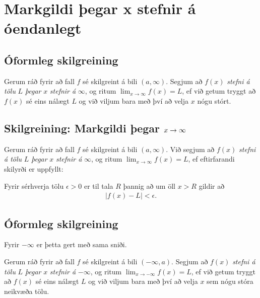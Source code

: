 \documentclass[a4paper,10pt,icelandic]{sphinxmanual}
\begin{document}
\section{Markgildi þegar x stefnir á óendanlegt}
\label{kafli02:markgildi-egar-x-stefnir-a-oendanlegt}


\subsection{Óformleg skilgreining}
\label{kafli02:id4}\label{kafli02:index-4}
Gerum ráð fyrir að fall \(f\) sé skilgreint á bili
\((a, \infty)\). Segjum að \(f(x)\) \emph{stefni á tölu} \(L\)
\emph{þegar} \(x\) \emph{stefnir á} \(\infty\), og ritum
\(\lim_{x\rightarrow \infty} f(x)=L\), ef við getum tryggt að
\(f(x)\) sé eins nálægt \(L\) og við viljum bara með því að
velja \(x\) nógu stórt.


\subsection{Skilgreining: Markgildi þegar \protect\(x \to \infty\protect\)}
\label{kafli02:skilgreining-markgildi-egar}
Gerum ráð fyrir að fall \(f\) sé skilgreint á bili
\((a,\infty)\). Við segjum að \(f(x)\) \emph{stefni á tölu} \(L\)
\emph{þegar} \(x\) \emph{stefnir á} \(\infty\), og ritum
\(\lim_{x\rightarrow \infty} f(x)=L\), ef eftirfarandi skilyrði er
uppfyllt:

Fyrir sérhverja tölu \(\epsilon>0\) er til tala \(R\)
þannig að um öll \(x>R\) gildir að
\begin{equation*}
\begin{split}|f(x)-L|<\epsilon.\end{split}
\end{equation*}

\subsection{Óformleg skilgreining}
\label{kafli02:id5}
Fyrir \(-\infty\) er þetta gert með sama sniði.

Gerum ráð fyrir að fall \(f\) sé skilgreint á bili
\((-\infty, a)\). Segjum að \(f(x)\) \emph{stefni á tölu} \(L\)
\emph{þegar} \(x\) \emph{stefnir á} \(-\infty\), og ritum
\(\lim_{x\rightarrow -\infty} f(x)=L\), ef við getum tryggt að
\(f(x)\) sé eins nálægt \(L\) og við viljum bara með því að
velja \(x\) sem nógu stóra neikvæða tölu.
\end{document}

